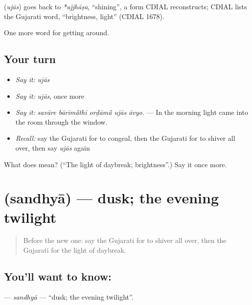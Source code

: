 \begin{cousinweb}
\textbf{} (\emph{ujās}) goes back to \emph{*ujjhāṣa}, \textquotedblleft{}shining\textquotedblright{}, a form CDIAL reconstructs; CDIAL lists the Gujarati word, \textquotedblleft{}brightness, light\textquotedblright{} (CDIAL 1678).
\end{cousinweb}

\begin{grammarlens}[title={What you've built}]
One more word for getting around.
\end{grammarlens}

\subsection*{Your turn}
\begin{itemize}
\raggedright
  \item \emph{Say it:} \emph{ujās}
  \item \emph{Say it:} \emph{ujās}, once more
  \item \emph{Say it:} \emph{savāre bārīmā̃thī orḍāmā̃ ujās āvyo.} — In the morning light came into the room through the window.
  \item \emph{Recall:} say the Gujarati for to congeal, then the Gujarati for to shiver all over, then say \emph{ujās} again
\end{itemize}

\begin{tcolorbox}[breakable,colback=teal!4,colframe=teal!35!black,title={Before you move on}]
What does  mean? (\textquotedblleft{}The light of daybreak; brightness\textquotedblright{}.) Say it once more.
\end{tcolorbox}
\section[\texorpdfstring{\gu{સંધ્યા} (sandhyā)}{સંધ્યા (sandhyā)}]{ (sandhyā) — dusk; the evening twilight}

\label{lesson:GU-C438-sandhya}



\begin{quote}
Before the new one: say the Gujarati for to shiver all over, then the Gujarati for the light of daybreak.
\end{quote}

\subsection*{You'll want to know: }
\textbf{} — \emph{sandhyā} — \textquotedblleft{}dusk; the evening twilight\textquotedblright{}.

